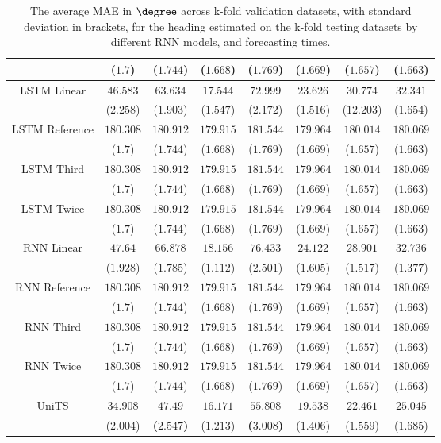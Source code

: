 \begin{table}[!ht]
{\begin{tabular}{|c|c|c|c|c|c|c|c|}
			 & ($1.7$) & ($1.744$) & ($1.668$) & ($1.769$) & ($1.669$) & ($1.657$) & ($1.663$) \\ \hline
			\multirow{2}{*}{LSTM Linear} & $46.583$ & $63.634$ & $17.544$ & $72.999$ & $23.626$ & $30.774$ & $32.341$ \\
			 & ($2.258$) & ($1.903$) & ($1.547$) & ($2.172$) & ($1.516$) & ($12.203$) & ($1.654$) \\ \hline
			\multirow{2}{*}{LSTM Reference} & $180.308$ & $180.912$ & $179.915$ & $181.544$ & $179.964$ & $180.014$ & $180.069$ \\
			 & ($1.7$) & ($1.744$) & ($1.668$) & ($1.769$) & ($1.669$) & ($1.657$) & ($1.663$) \\ \hline
			\multirow{2}{*}{LSTM Third} & $180.308$ & $180.912$ & $179.915$ & $181.544$ & $179.964$ & $180.014$ & $180.069$ \\
			 & ($1.7$) & ($1.744$) & ($1.668$) & ($1.769$) & ($1.669$) & ($1.657$) & ($1.663$) \\ \hline
			\multirow{2}{*}{LSTM Twice} & $180.308$ & $180.912$ & $179.915$ & $181.544$ & $179.964$ & $180.014$ & $180.069$ \\
			 & ($1.7$) & ($1.744$) & ($1.668$) & ($1.769$) & ($1.669$) & ($1.657$) & ($1.663$) \\ \hline
			\multirow{2}{*}{RNN Linear} & $47.64$ & $66.878$ & $18.156$ & $76.433$ & $24.122$ & $28.901$ & $32.736$ \\
			 & ($1.928$) & ($1.785$) & ($1.112$) & ($2.501$) & ($1.605$) & ($1.517$) & ($1.377$) \\ \hline
			\multirow{2}{*}{RNN Reference} & $180.308$ & $180.912$ & $179.915$ & $181.544$ & $179.964$ & $180.014$ & $180.069$ \\
			 & ($1.7$) & ($1.744$) & ($1.668$) & ($1.769$) & ($1.669$) & ($1.657$) & ($1.663$) \\ \hline
			\multirow{2}{*}{RNN Third} & $180.308$ & $180.912$ & $179.915$ & $181.544$ & $179.964$ & $180.014$ & $180.069$ \\
			 & ($1.7$) & ($1.744$) & ($1.668$) & ($1.769$) & ($1.669$) & ($1.657$) & ($1.663$) \\ \hline
			\multirow{2}{*}{RNN Twice} & $180.308$ & $180.912$ & $179.915$ & $181.544$ & $179.964$ & $180.014$ & $180.069$ \\
			 & ($1.7$) & ($1.744$) & ($1.668$) & ($1.769$) & ($1.669$) & ($1.657$) & ($1.663$) \\ \hline
			\multirow{2}{*}{UniTS} & $34.908$ & $\mathbf{47.49}$ & $16.171$ & $\mathbf{55.808}$ & $19.538$ & $22.461$ & $25.045$ \\
			 & ($2.004$) & \textbf{(}$\mathbf{2.547}$\textbf{)} & ($1.213$) & \textbf{(}$\mathbf{3.008}$\textbf{)} & ($1.406$) & ($1.559$) & ($1.685$) \\ \hline
		\end{tabular}
	}
	\caption{The average MAE in $\degree$ across k-fold validation datasets, with standard deviation in brackets, for the heading estimated on the k-fold testing datasets by different RNN models, and forecasting times.}
	\label{tab:all_direction_MAE}
\end{table}